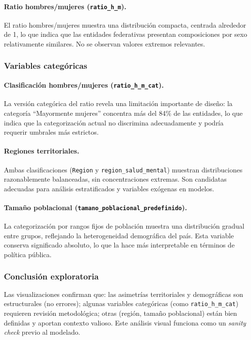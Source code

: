 \documentclass[12pt,letterpaper]{article}
\newcommand{\code}[1]{\texttt{\small #1}}
\begin{document}
\paragraph{Ratio hombres/mujeres (\code{ratio\_h\_m}).}
El ratio hombres/mujeres muestra una distribución compacta, centrada alrededor de 1, lo que indica que las entidades federativas presentan composiciones por sexo relativamente similares. No se observan valores extremos relevantes.

\subsubsection{Variables categóricas}

\paragraph{Clasificación hombres/mujeres (\code{ratio\_h\_m\_cat}).}
La versión categórica del ratio revela una limitación importante de diseño: la categoría ``Mayormente mujeres'' concentra más del 84\% de las entidades, lo que indica que la categorización actual no discrimina adecuadamente y podría requerir umbrales más estrictos.

\paragraph{Regiones territoriales.}
Ambas clasificaciones (\code{Region} y \code{region\_salud\_mental}) muestran distribuciones razonablemente balanceadas, sin concentraciones extremas. Son candidatas adecuadas para análisis estratificados y variables exógenas en modelos.

\paragraph{Tamaño poblacional (\code{tamano\_poblacional\_\allowbreak predefinido}).}
La categorización por rangos fijos de población muestra una distribución gradual entre grupos, reflejando la heterogeneidad demográfica del país. Esta variable conserva significado absoluto, lo que la hace más interpretable en términos de política pública.

\subsubsection{Conclusión exploratoria}

Las visualizaciones confirman que: las asimetrías territoriales y demográficas son estructurales (no errores); algunas variables categóricas (como \code{ratio\_h\_m\_cat}) requieren revisión metodológica; otras (región, tamaño poblacional) están bien definidas y aportan contexto valioso. Este análisis visual funciona como un \textit{sanity check} previo al modelado.
\end{document}
